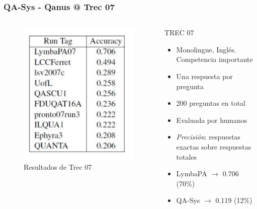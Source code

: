 \begin{frame}
\frametitle{QA-Sys - Qanus @ Trec 07}
\begin{columns}[T] %
\begin{column}{.48\textwidth}
  \begin{figure}
      \includegraphics[scale=0.5]{graficos/trec-7-accuracy-reduced}
    \caption{Resultados de Trec 07}
    \label{fig:tareas}
  \end{figure}
\end{column}%
\hfill%
\begin{column}{.48\textwidth}

  \begin{block}{TREC 07}
      \begin{itemize}
          \item Monolingue, Inglés. Competencia importante
          \item Una respuesta por pregunta
          \item 200 preguntas en total
          \item Evaluada por humanos
          \item \textit{Precisión}: respuestas exactas sobre respuestas totales
          \item LymbaPA $\rightarrow$ {\color{blue}0.706} (70\%)
          \item QA-Sys $\rightarrow$ {\color{blue}0.119} (12\%)
        \end{itemize}
  \end{block}
\end{column}%
\end{columns}

\end{frame}


